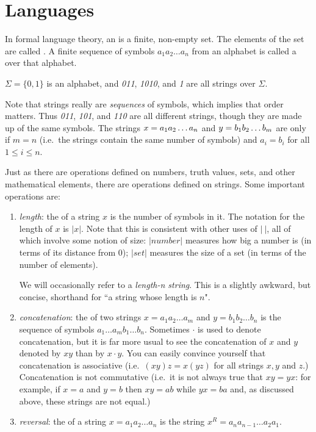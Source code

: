 \section{Languages}
In formal language theory, an  is a finite, non-empty 
set.  The elements of the set are called .  A finite 
sequence of symbols $a_1a_2\ldots a_n$
from an alphabet is called a  over that alphabet.  

\smallskip

\begin{example}
$\Sigma = \{0,1\}$ is an alphabet, and {\em 011}, 
{\em 1010}, and {\em 1} are all strings over $\Sigma$.
\end{example}

\smallskip

Note that strings really are \emph{sequences} of symbols, which 
implies that 
order matters.  Thus {\em 011}, {\em 101}, and {\em 110} are all 
different strings, though they are made up of the same symbols.
The strings $x=\mbox{{${a}_1{a}_2\ldots {a}_{n}$}}$ and $y=\mbox{{${b}_1{b}_2\ldots {b}_{m}$}}$ are  only
if $m=n$ (i.e.\ the strings contain the same number of symbols) and 
$a_i=b_i$ for all
$1 \leq i \leq n$.

Just as there are operations defined on numbers, truth values, sets,
and other mathematical elements, there are operations defined on
strings.  Some important operations are:
\begin{enumerate}
\item {\em length}: the  of a string $x$ is the number of symbols
in it.  The notation for the length of $x$ is $|x|$.  Note that
this is consistent with other uses of $|\ |$, all of which 
involve some notion of size: $|number|$ measures how big a number
is (in terms of its distance from 0);  $|set|$ measures the size
of a set (in terms of the number of elements).

We will occasionally refer to a {\em length-n string}.  This is a
slightly awkward, but concise, shorthand for ``a string whose length
is $n$".

\item {\em concatenation}: the  of two strings $x=a_1
a_2\ldots a_m$ and $y=b_1b_2\ldots b_n$ is the sequence of symbols
$a_1\ldots a_mb_1\ldots b_n$.  Sometimes $\cdot$ is used to denote
concatenation, but it is far more usual to see the concatenation of 
$x$ and $y$ denoted by $xy$ than by $x\cdot y$.  You can easily
convince yourself that concatenation is associative (i.e.\ $(xy)z =
x(yz)$ for all strings $x,y$ and $z$.)  Concatenation is not
commutative (i.e.\ it is not always true that $xy = yx$:
for example, if $x=a$ and $y=b$ then $xy=ab$ while $yx=ba$ and, as
discussed above, these strings are not equal.)

\item {\em reversal}: the  of a string $x=a_1a_2\ldots a_n$ is
the string $x^R = a_na_{n-1}\ldots a_2a_1$.
\end{enumerate}

